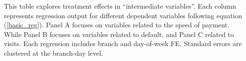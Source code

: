 \documentclass[12pt, a4paper, colorinlistoftodos]{article}
\begin{document}
\begin{landscape}
\begin{table}[!h]
\begin{center}
\end{center}
\footnotesize{This table explores treatment effects in ``intermediate variables''. Each column represents regression output for different dependent variables following equation (\ref{basic_reg}). Panel A focuses on variables related to the speed of payment. While Panel B focuses on variables related to default, and Panel C related to visits. 
Each regression includes branch and day-of-week FE. Standard errors are clustered at the branch-day level.}
\end{table}
\end{landscape}

\normalsize
\normalsize



\end{document}
